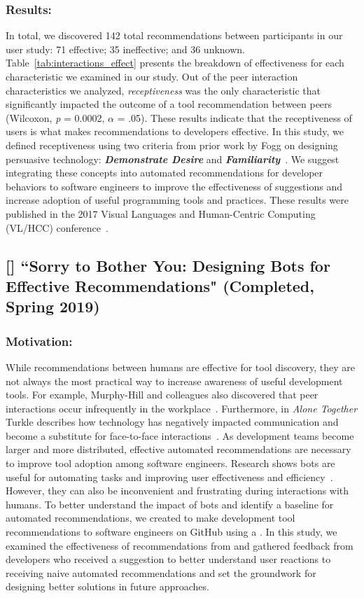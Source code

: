 \subsubsection{Results:}

In total, we discovered 142 total recommendations between participants in our user study: 71 effective; 35 ineffective; and 36 unknown. Table~\ref{tab:interactions_effect} presents the breakdown of effectiveness for each characteristic we examined in our study. Out of the peer interaction characteristics we analyzed, \textit{receptiveness} was the only characteristic that significantly impacted the outcome of a tool recommendation between peers (Wilcoxon, \textit{p} = 0.0002, $\alpha$ = .05). These results indicate that the receptiveness of users is what makes recommendations to developers effective. In this study, we defined receptiveness using two criteria from prior work by Fogg on designing persuasive technology: \textit{\textbf{Demonstrate Desire}} and \textit{\textbf{Familiarity}}~\cite{Fogg2009Persuasive}. We suggest integrating these concepts into automated recommendations for developer behaviors to software engineers to improve the effectiveness of suggestions and increase adoption of useful programming tools and practices. These results were published in the 2017 Visual Languages and Human-Centric Computing (VL/HCC) conference~\cite{VLHCC}.


\subsection{[\sorryT] ``Sorry to Bother You: Designing Bots for
Effective Recommendations" (Completed, Spring 2019)}

\subsubsection{Motivation:}

While recommendations between humans are effective for tool discovery, they are not always the most practical way to increase awareness of useful development tools. For example, Murphy-Hill and colleagues also discovered that peer interactions occur infrequently in the workplace~\cite{Murphy-Hill2011PeerInteraction}. Furthermore, in \textit{Alone Together} Turkle describes how technology has negatively impacted communication and become a substitute for face-to-face interactions~\cite{turkle2017alone}. As development teams become larger and more distributed, effective automated recommendations are necessary to improve tool adoption among software engineers. Research shows bots are useful for automating tasks and improving user effectiveness and efficiency~\cite{StoreyBots}. However, they can also be inconvenient and frustrating during interactions with humans. To better understand the impact of bots and identify a baseline for automated recommendations, we created \tool to make development tool recommendations to software engineers on GitHub using a \tele. In this study, we examined the effectiveness of recommendations from \tool and gathered feedback from developers who received a suggestion to better understand user reactions to receiving naive automated recommendations and set the groundwork for designing better solutions in future approaches.


